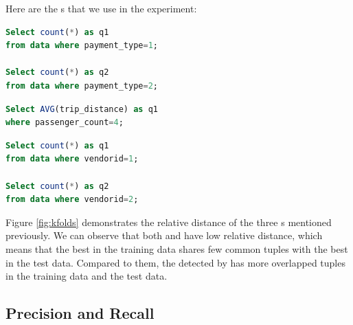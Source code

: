 

Here are the {\fact}s that we use in the experiment:

\renewcommand{\lstlistingname}{{Fact}}%
\begin{lstlisting}[language=SQL, caption=q1/q2, label=qry:o1]
Select count(*) as q1 
from data where payment_type=1;

Select count(*) as q2 
from data where payment_type=2;
\end{lstlisting}

\begin{lstlisting}[language=SQL, caption=q1, label=qry:o2]
Select AVG(trip_distance) as q1 
where passenger_count=4;
\end{lstlisting}

\begin{lstlisting}[language=SQL, caption=q1/q2, label=qry:o3]
Select count(*) as q1 
from data where vendorid=1;

Select count(*) as q2 
from data where vendorid=2;
\end{lstlisting}

Figure \ref{fig:kfolds} demonstrates the relative distance of the three {\fact}s mentioned previously. We can observe that both {\aggravation} and {\intervention} have low relative distance, which means that the best {\explanation} in the training data shares few common tuples with the best {\explanation} in the test data. Compared to them, the {\explanation} detected by {\solution} has more overlapped tuples in the training data and the test data. 

\subsection{Precision and Recall}

